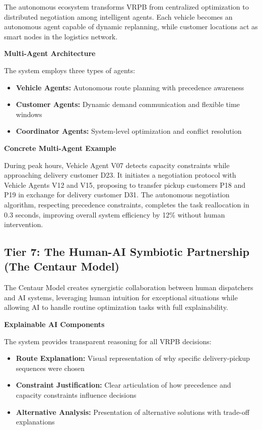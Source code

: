 \documentclass{article}
\begin{document}
The autonomous ecosystem transforms VRPB from centralized optimization to distributed negotiation among intelligent agents. Each vehicle becomes an autonomous agent capable of dynamic replanning, while customer locations act as smart nodes in the logistics network.

\textbf{Multi-Agent Architecture}

The system employs three types of agents:
\begin{itemize}
\item \textbf{Vehicle Agents:} Autonomous route planning with precedence awareness
\item \textbf{Customer Agents:} Dynamic demand communication and flexible time windows
\item \textbf{Coordinator Agents:} System-level optimization and conflict resolution
\end{itemize}

\textbf{Concrete Multi-Agent Example}

During peak hours, Vehicle Agent V07 detects capacity constraints while approaching delivery customer D23. It initiates a negotiation protocol with Vehicle Agents V12 and V15, proposing to transfer pickup customers P18 and P19 in exchange for delivery customer D31. The autonomous negotiation algorithm, respecting precedence constraints, completes the task reallocation in 0.3 seconds, improving overall system efficiency by 12\% without human intervention.

\subsection{Tier 7: The Human-AI Symbiotic Partnership (The Centaur Model)}

The Centaur Model creates synergistic collaboration between human dispatchers and AI systems, leveraging human intuition for exceptional situations while allowing AI to handle routine optimization tasks with full explainability.

\textbf{Explainable AI Components}

The system provides transparent reasoning for all VRPB decisions:
\begin{itemize}
\item \textbf{Route Explanation:} Visual representation of why specific delivery-pickup sequences were chosen
\item \textbf{Constraint Justification:} Clear articulation of how precedence and capacity constraints influence decisions
\item \textbf{Alternative Analysis:} Presentation of alternative solutions with trade-off explanations
\end{itemize}
\end{document}
